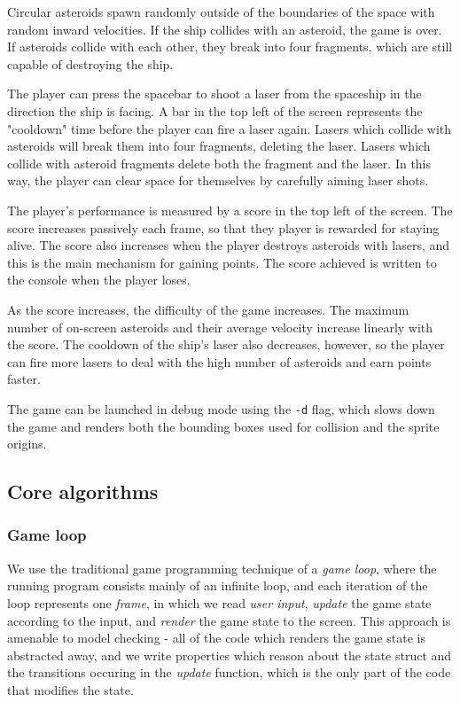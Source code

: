 \documentclass{article}
\begin{document}
        Circular asteroids spawn randomly outside of the boundaries of the
        space with random inward velocities. If the ship collides with an
        asteroid, the game is over. If asteroids collide with each other, they
        break into four fragments, which are still capable of destroying the
        ship.

        The player can press the spacebar to shoot a laser from the spaceship
        in the direction the ship is facing. A bar in the top left of the
        screen represents the "cooldown" time before the player can fire a laser
        again. Lasers which collide with asteroids will break them into four
        fragments, deleting the laser. Lasers which collide with asteroid
        fragments delete both the fragment and the laser. In this way, the
        player can clear space for themselves by carefully aiming laser shots.

        The player's performance is measured by a score in the top left of the
        screen. The score increases passively each frame, so that they player
        is rewarded for staying alive. The score also increases when the player
        destroys asteroids with lasers, and this is the main mechanism for
        gaining points. The score achieved is written to the console when the
        player loses.

        As the score increases, the difficulty of the game increases. The
        maximum number of on-screen asteroids and their average velocity
        increase linearly with the score. The cooldown of the ship's laser also
        decreases, however, so the player can fire more lasers to deal with the
        high number of asteroids and earn points faster.

        The game can be launched in debug mode using the \texttt{-d} flag, which
        slows down the game and renders both the bounding boxes used for
        collision and the sprite origins.

    \subsection{Core algorithms}

        \subsubsection{Game loop}

            We use the traditional game programming technique of a \textit{game
            loop}, where the running program consists mainly of an infinite
            loop, and each iteration of the loop represents one \textit{frame},
            in which we read \textit{user input}, \textit{update} the game state
            according to the input, and \textit{render} the game state to the
            screen. This approach is amenable to model checking - all of the
            code which renders the game state is abstracted away, and we write
            properties which reason about the state struct and the transitions
            occuring in the \textit{update} function, which is the only part of
            the code that modifies the state.
\end{document}
